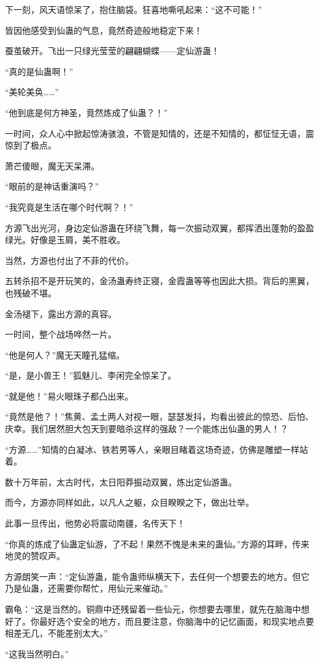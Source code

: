 \begin{this_body}
下一刻，风天语惊呆了，抱住脑袋。狂喜地嘶吼起来：“这不可能！”

皆因他感受到仙蛊的气息，竟然奇迹般地稳定下来！

蚕茧破开。飞出一只绿光莹莹的翩翩蝴蝶——定仙游蛊！

“真的是仙蛊啊！”

“美轮美奂……”

“他到底是何方神圣，竟然炼成了仙蛊？！”

一时间，众人心中掀起惊涛骇浪，不管是知情的，还是不知情的，都怔怔无语，震惊到了极点。

萧芒傻眼，魔无天呆滞。

“眼前的是神话重演吗？”

“我究竟是生活在哪个时代啊？！”

方源飞出光河，身边定仙游蛊在环绕飞舞，每一次振动双翼，都挥洒出蓬勃的盈盈绿光。好像是玉屑，美不胜收。

当然，方源也付出了不菲的代价。

五转杀招不是开玩笑的，金汤蛊寿终正寝，金霞蛊等等也因此大损。背后的黑翼，也残破不堪。

金汤褪下，露出方源的真容。

一时间，整个战场哗然一片。

“他是何人？”魔无天瞳孔猛缩。

“是，是小兽王！”狐魅儿、李闲完全惊呆了。

“就是他！”易火眼珠子都凸出来。

“竟然是他？！”焦黄、孟土两人对视一眼，瑟瑟发抖，均看出彼此的惊恐、后怕、庆幸。我们居然胆大包天到要暗杀这样的强敌？一个能炼出仙蛊的男人！？

“方源……”知情的白凝冰、铁若男等人，亲眼目睹着这场奇迹，仿佛是雕塑一样站着。

数十万年前，太古时代，太日阳莽振动双翼，炼出定仙游蛊。

而今，方源亦同样如此，以凡人之躯，众目睽睽之下，做出壮举。

此事一旦传出，他势必将震动南疆，名传天下！

“你真的炼成了仙蛊定仙游，了不起！果然不愧是未来的蛊仙。”方源的耳畔，传来地灵的赞叹声。

方源朗笑一声：“定仙游蛊，能令蛊师纵横天下，去任何一个想要去的地方。但它乃是仙蛊，还需要你帮忙，用仙元来催动。”

霸龟：“这是当然的。铜鼎中还残留着一些仙元，你想要去哪里，就先在脑海中想好了。你最好选个安全的地方，而且要注意，你脑海中的记忆画面，和现实地点要相差无几，不能差别太大。”

“这我当然明白。”


\end{this_body}
